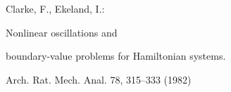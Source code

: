 \documentclass{llncs}
\begin{document}



\begin{thebibliography}{5}

%


Clarke, F., Ekeland, I.:

Nonlinear oscillations and

boundary-value problems for Hamiltonian systems.

Arch. Rat. Mech. Anal. 78, 315--333 (1982)



\end{thebibliography}



%

%





\end{document}
